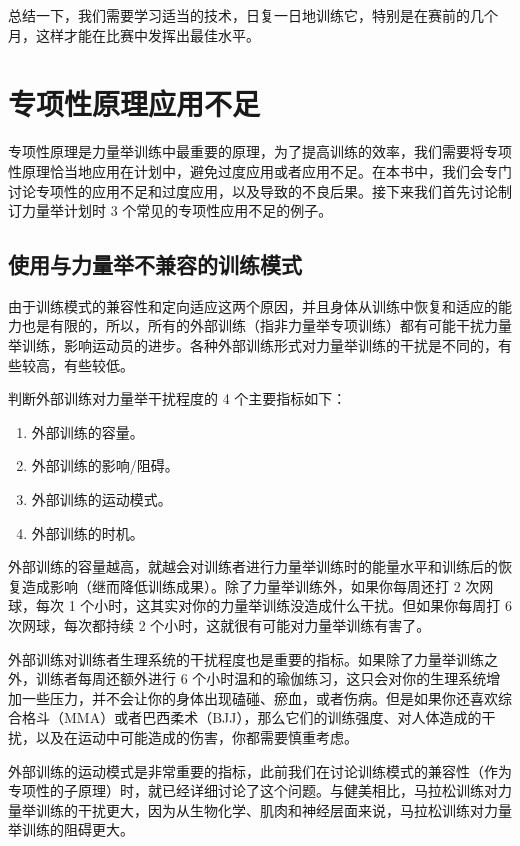 \documentclass[fontset=fandol, a4paper, 12pt, openright]{ctexbook}
\begin{document}
总结一下，我们需要学习适当的技术，日复一日地训练它，特别是在赛前的几个月，这样才能在比赛中发挥出最佳水平。

\section{专项性原理应用不足}

专项性原理是力量举训练中最重要的原理，为了提高训练的效率，我们需要将专项性原理恰当地应用在计划中，避免过度应用或者应用不足。在本书中，我们会专门讨论专项性的应用不足和过度应用，以及导致的不良后果。接下来我们首先讨论制订力量举计划时 3 个常见的专项性应用不足的例子。

\subsection{使用与力量举不兼容的训练模式}

由于训练模式的兼容性和定向适应这两个原因，并且身体从训练中恢复和适应的能力也是有限的，所以，所有的外部训练（指非力量举专项训练）都有可能干扰力量举训练，影响运动员的进步。各种外部训练形式对力量举训练的干扰是不同的，有些较高，有些较低。

判断外部训练对力量举干扰程度的 4 个主要指标如下：
\begin{enumerate}
    \item 外部训练的容量。
    \item 外部训练的影响/阻碍。
    \item 外部训练的运动模式。
    \item 外部训练的时机。
\end{enumerate}

外部训练的容量越高，就越会对训练者进行力量举训练时的能量水平和训练后的恢复造成影响（继而降低训练成果）。除了力量举训练外，如果你每周还打 2 次网球，每次 1 个小时，这其实对你的力量举训练没造成什么干扰。但如果你每周打 6 次网球，每次都持续 2 个小时，这就很有可能对力量举训练有害了。

外部训练对训练者生理系统的干扰程度也是重要的指标。如果除了力量举训练之外，训练者每周还额外进行 6 个小时温和的瑜伽练习，这只会对你的生理系统增加一些压力，并不会让你的身体出现磕碰、瘀血，或者伤病。但是如果你还喜欢综合格斗（MMA）或者巴西柔术（BJJ），那么它们的训练强度、对人体造成的干扰，以及在运动中可能造成的伤害，你都需要慎重考虑。

外部训练的运动模式是非常重要的指标，此前我们在讨论训练模式的兼容性（作为专项性的子原理）时，就已经详细讨论了这个问题。与健美相比，马拉松训练对力量举训练的干扰更大，因为从生物化学、肌肉和神经层面来说，马拉松训练对力量举训练的阻碍更大。
\end{document}
